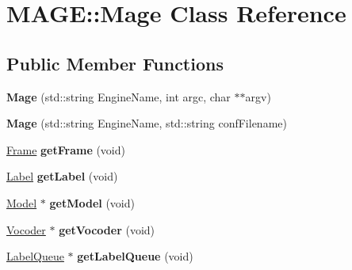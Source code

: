 \hypertarget{class_m_a_g_e_1_1_mage}{\section{M\-A\-G\-E\-:\-:Mage Class Reference}
\label{class_m_a_g_e_1_1_mage}
}
\subsection*{Public Member Functions}
\begin{DoxyCompactItemize}
\item 
\hypertarget{class_m_a_g_e_1_1_mage_addc8c5637cd9e1c38b077354bd89da33}{{\bfseries Mage} (std\-::string Engine\-Name, int argc, char $\ast$$\ast$argv)}\label{class_m_a_g_e_1_1_mage_addc8c5637cd9e1c38b077354bd89da33}

\item 
\hypertarget{class_m_a_g_e_1_1_mage_a5c50ae1e8e7384c88912035efa47af4d}{{\bfseries Mage} (std\-::string Engine\-Name, std\-::string conf\-Filename)}\label{class_m_a_g_e_1_1_mage_a5c50ae1e8e7384c88912035efa47af4d}

\item 
\hypertarget{class_m_a_g_e_1_1_mage_ae8ea8a1afdb6a62f0813b4bdadc25281}{\hyperlink{struct_m_a_g_e_1_1_frame}{Frame} {\bfseries get\-Frame} (void)}\label{class_m_a_g_e_1_1_mage_ae8ea8a1afdb6a62f0813b4bdadc25281}

\item 
\hypertarget{class_m_a_g_e_1_1_mage_ac1e3d8167214d6e3f4738981a4d5e36d}{\hyperlink{class_m_a_g_e_1_1_label}{Label} {\bfseries get\-Label} (void)}\label{class_m_a_g_e_1_1_mage_ac1e3d8167214d6e3f4738981a4d5e36d}

\item 
\hypertarget{class_m_a_g_e_1_1_mage_a5a5c3797369cb5a8a8f65aeed98c94a1}{\hyperlink{class_m_a_g_e_1_1_model}{Model} $\ast$ {\bfseries get\-Model} (void)}\label{class_m_a_g_e_1_1_mage_a5a5c3797369cb5a8a8f65aeed98c94a1}

\item 
\hypertarget{class_m_a_g_e_1_1_mage_a1d0b5e7d42b9a72d53e3d9bcd853f12b}{\hyperlink{class_m_a_g_e_1_1_vocoder}{Vocoder} $\ast$ {\bfseries get\-Vocoder} (void)}\label{class_m_a_g_e_1_1_mage_a1d0b5e7d42b9a72d53e3d9bcd853f12b}

\item 
\hypertarget{class_m_a_g_e_1_1_mage_a8f02241895387ecd266748e6c8c54cde}{\hyperlink{class_m_a_g_e_1_1_label_queue}{Label\-Queue} $\ast$ {\bfseries get\-Label\-Queue} (void)}\label{class_m_a_g_e_1_1_mage_a8f02241895387ecd266748e6c8c54cde}


\end{DoxyCompactItemize}
